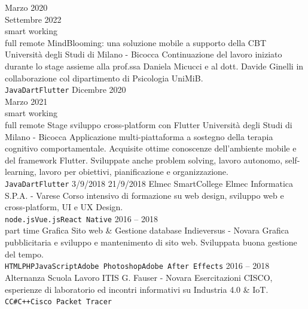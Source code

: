 \documentclass[9pt]{developercv}
\begin{document}
\begin{entrylist}
	\entry
		{Marzo 2020 \\ Settembre 2022 \\\footnotesize{smart working}\\\footnotesize{full remote}}
		{MindBlooming: una soluzione mobile a supporto della CBT}
		{Università degli Studi di Milano - Bicocca}
		{Continuazione del lavoro iniziato durante lo stage assieme alla prof.ssa Daniela Micucci e al dott. Davide Ginelli in collaborazione col dipartimento di Psicologia UniMiB. \\ \texttt{Java}\slashsep\texttt{Dart}\slashsep\texttt{Flutter}}
	\entry
		{Dicembre 2020 \\ Marzo 2021\\\footnotesize{smart working}\\\footnotesize{full remote}}
		{Stage sviluppo cross-platform con Flutter}
		{Università degli Studi di Milano - Bicocca}
		{Applicazione multi-piattaforma a sostegno della terapia cognitivo comportamentale. Acquisite ottime conoscenze dell'ambiente mobile e del framework Flutter. Sviluppate anche problem solving, lavoro autonomo, self-learning, lavoro per obiettivi, pianificazione e organizzazione. \\ \texttt{Java}\slashsep\texttt{Dart}\slashsep\texttt{Flutter}}
	\entry
		{3/9/2018  21/9/2018}
		{Elmec SmartCollege}
		{Elmec Informatica S.P.A. - Varese}
		{Corso intensivo di formazione su web design, sviluppo web e cross-platform, UI e UX Design. \\ \texttt{node.js}\slashsep\texttt{Vue.js}\slashsep\texttt{React Native}}
	\entry
		{2016 -- 2018\\\footnotesize{part time}}
		{Grafica Sito web \& Gestione database}
		{Indieversus - Novara}
		{Grafica pubblicitaria e sviluppo e mantenimento di sito web. Sviluppata buona gestione del tempo. \\ \texttt{HTML}\slashsep\texttt{PHP}\slashsep\texttt{JavaScript}\slashsep\texttt{Adobe Photoshop}\slashsep\texttt{Adobe After Effects}}
	\entry
		{2016 -- 2018}
		{Alternanza Scuola Lavoro}
		{ITIS G. Fauser - Novara}
		{Esercitazioni CISCO, esperienze di laboratorio ed incontri informativi su Industria 4.0 \& IoT. \\ \texttt{C}\slashsep\texttt{C\#}\slashsep\texttt{C++}\slashsep\texttt{Cisco Packet Tracer}}
\end{entrylist}

\end{document}
